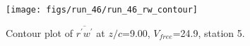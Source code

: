 \begin{figure}[H]
\centering
\texttt{[image: figs/run\_46/run\_46\_rw\_contour]}
\caption{Contour plot of $\overline{r^\prime w^\prime}$ at $z/c$=9.00, $V_{free}$=24.9, station 5.}
\label{fig:run_46_rw_contour}
\end{figure}


